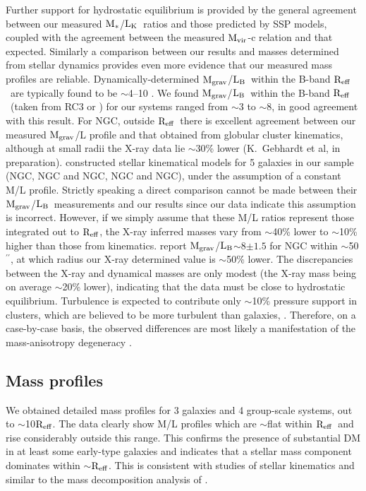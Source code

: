 \documentclass{emulateapj}
\def \arcsec {\hbox{$^{\prime\prime}$}}
\def \eg {e.g.}
\newcommand{\mvir}{${\rm M_{vir}}$}
\newcommand{\reff}{${\rm R_{eff}}$}
\newcommand{\mstars}{${\rm M_{*}}$}
\newcommand{\mgrav}{${\rm M_{grav}}$}
\newcommand{\lb }{${\rm L_B}$}
\newcommand{\lk }{${\rm L_K}$}
\newcommand{\thin}{\thinspace}
\begin{document}
Further support for hydrostatic equilibrium is provided by 
the general agreement between our measured
\mstars/\lk\ ratios and those predicted by SSP models, 
coupled with the agreement between the measured \mvir-c relation 
and that expected.
Similarly a comparison between our results and masses determined 
from stellar dynamics provides even more evidence that our 
measured mass profiles are reliable. 
Dynamically-determined \mgrav/\lb\ within the B-band  \reff\ are 
typically found to be $\sim$4--10 \citep{gerhard01a,trujillo04a}.
We found \mgrav/\lb\ within the B-band \reff\
(taken from RC3 or \citealt{faber89}) for our systems ranged
from $\sim$3 to $\sim$8, in good agreement
with this result. 
For NGC\thin 4649, outside \reff\ there is excellent agreement
between our measured \mgrav/L profile and that obtained from globular 
cluster kinematics, although at small radii the X-ray data
lie $\sim$30\% lower (K.\ Gebhardt et al, in preparation).
\citet{vandermarel91a} constructed stellar kinematical models
for 5 galaxies in our sample (NGC\thin 720, NGC\thin 1407 and 
NGC\thin 4261, NGC\thin 4472 and NGC\thin 4649), under the assumption
of a constant M/L profile. Strictly speaking a direct comparison cannot
be made between their \mgrav/\lb\ measurements and our results since our
data indicate this assumption is incorrect. However, if we simply assume 
that these M/L ratios represent those integrated out to \reff, the 
X-ray inferred
masses vary from $\sim$40\% lower to $\sim$10\% higher than those
from kinematics. \citet{kronawitter00a}
report \mgrav/\lb$\sim$8$\pm1.5$ for NGC\thin 4472 within $\sim$50\arcsec,
at which radius our X-ray determined value is $\sim$50\% lower. The
discrepancies between the X-ray and dynamical masses are only modest
(the X-ray mass being on average $\sim$20\% lower), indicating that
the data must be close to hydrostatic equilibrium.  
Turbulence is expected to contribute only $\sim$10\% pressure support
in clusters, which are believed to be more turbulent than galaxies,
\citep{rasia06a}.
Therefore, on a case-by-case
basis, the observed differences are most likely a manifestation of the 
mass-anisotropy degeneracy \citep[\eg][]{dekel05a}.

\subsection{Mass profiles}
We obtained detailed mass profiles for 3 galaxies and 4 group-scale
systems, out to $\sim$10\reff. The data clearly show M/L profiles
which are $\sim$flat within \reff\ and rise considerably outside
this range. This confirms the presence of substantial DM in
at least some early-type galaxies and indicates that a stellar mass 
component dominates within $\sim$\reff. 
This is consistent with studies of 
stellar kinematics and similar to the mass decomposition analysis
of \citet{brighenti97a}.
\end{document}
